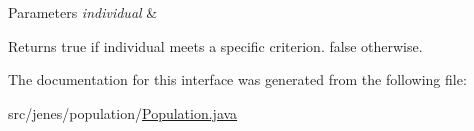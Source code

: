 \begin{DoxyParams}{Parameters}
{\em individual} & \\
\hline
\end{DoxyParams}
\begin{DoxyReturn}{Returns}
{\ttfamily true} if individual meets a specific criterion. {\ttfamily  false } otherwise. 
\end{DoxyReturn}


The documentation for this interface was generated from the following file\-:\begin{DoxyCompactItemize}
\item 
src/jenes/population/\hyperlink{_population_8java}{Population.\-java}\end{DoxyCompactItemize}
